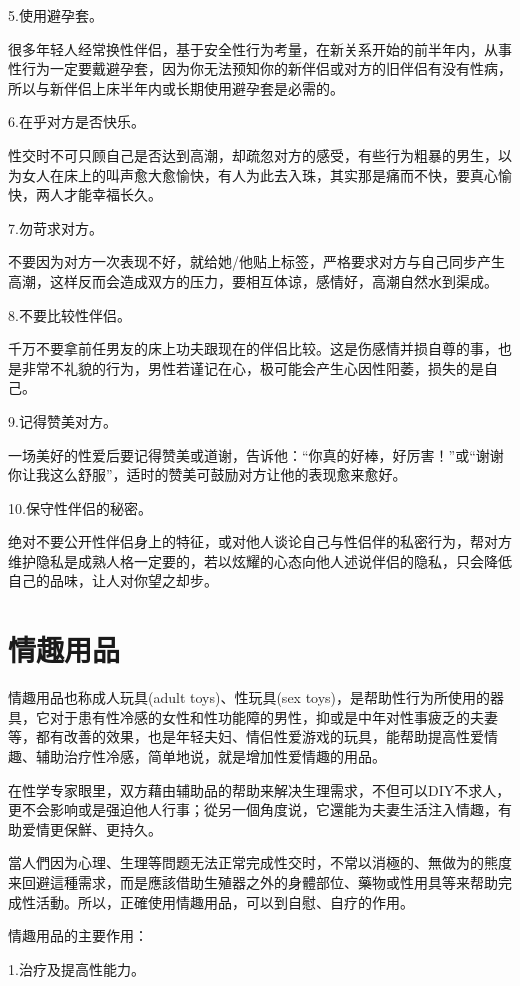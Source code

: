 \documentclass[12pt,UTF8]{ctexbook}
\begin{document}
5.使用避孕套。

很多年轻人经常换性伴侣，基于安全性行为考量，在新关系开始的前半年内，从事性行为一定要戴避孕套，因为你无法预知你的新伴侣或对方的旧伴侣有没有性病，所以与新伴侣上床半年内或长期使用避孕套是必需的。

6.在乎对方是否快乐。

性交时不可只顾自己是否达到高潮，却疏忽对方的感受，有些行为粗暴的男生，以为女人在床上的叫声愈大愈愉快，有人为此去入珠，其实那是痛而不快，要真心愉快，两人才能幸福长久。

7.勿苛求对方。

不要因为对方一次表现不好，就给她/他贴上标签，严格要求对方与自己同步产生高潮，这样反而会造成双方的压力，要相互体谅，感情好，高潮自然水到渠成。

8.不要比较性伴侣。

千万不要拿前任男友的床上功夫跟现在的伴侣比较。这是伤感情并损自尊的事，也是非常不礼貌的行为，男性若谨记在心，极可能会产生心因性阳萎，损失的是自己。

9.记得赞美对方。

一场美好的性爱后要记得赞美或道谢，告诉他：“你真的好棒，好厉害！”或“谢谢你让我这么舒服”，适时的赞美可鼓励对方让他的表现愈来愈好。

10.保守性伴侣的秘密。

绝对不要公开性伴侣身上的特征，或对他人谈论自己与性侣伴的私密行为，帮对方维护隐私是成熟人格一定要的，若以炫耀的心态向他人述说伴侣的隐私，只会降低自己的品味，让人对你望之却步。

\chapter{情趣用品}

情趣用品也称成人玩具(adult toys)、性玩具(sex toys)，是帮助性行为所使用的器具，它对于患有性冷感的女性和性功能障的男性，抑或是中年对性事疲乏的夫妻等，都有改善的效果，也是年轻夫妇、情侣性爱游戏的玩具，能帮助提高性爱情趣、辅助治疗性冷感，简单地说，就是增加性爱情趣的用品。

在性学专家眼里，双方藉由辅助品的帮助来解决生理需求，不但可以DIY不求人，更不会影响或是强迫他人行事；從另一個角度说，它還能为夫妻生活注入情趣，有助爱情更保鮮、更持久。

當人們因为心理、生理等問题无法正常完成性交时，不常以消極的、無做为的熊度来回避這種需求，而是應該借助生殖器之外的身體部位、藥物或性用具等来帮助完成性活動。所以，正確使用情趣用品，可以到自慰、自疗的作用。

情趣用品的主要作用：

1.治疗及提高性能力。
\end{document}
